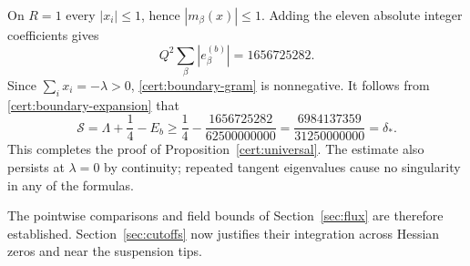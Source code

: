 On $R=1$ every $|x_i|\le1$, hence $|m_\beta(x)|\le1$.  Adding the eleven
absolute integer coefficients gives
\[
 Q^2\sum_\beta|e^{(b)}_\beta|=1656725282.
\]
Since $\sum_i x_i=-\lambda>0$, \eqref{cert:boundary-gram} is nonnegative.
It follows from \eqref{cert:boundary-expansion} that
\[
 \mathcal S=\Lambda+\frac14-E_b
 \ge\frac14-\frac{1656725282}{62500000000}
 =\frac{6984137359}{31250000000}=\delta_*.
\]
This completes the proof of Proposition~\ref{cert:universal}.  The estimate
also persists at $\lambda=0$ by continuity; repeated tangent eigenvalues
cause no singularity in any of the formulas.

The pointwise comparisons and field bounds of Section~\ref{sec:flux}
are therefore established. Section~\ref{sec:cutoffs} now justifies their
integration across Hessian zeros and near the suspension tips.
